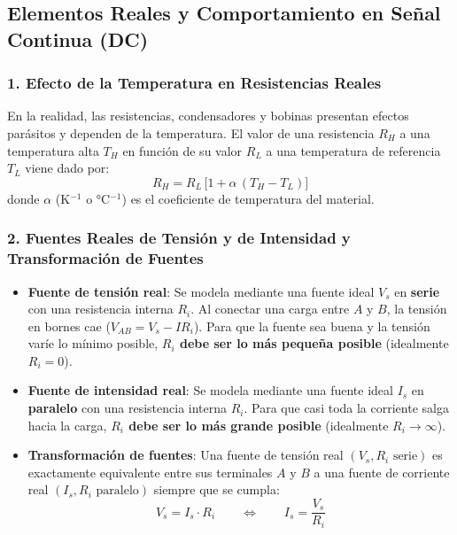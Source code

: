 \subsection{Elementos Reales y Comportamiento en Señal Continua (DC)}

\subsubsection{1. Efecto de la Temperatura en Resistencias Reales}
En la realidad, las resistencias, condensadores y bobinas presentan efectos parásitos y dependen de la temperatura. El valor de una resistencia $R_H$ a una temperatura alta $T_H$ en función de su valor $R_L$ a una temperatura de referencia $T_L$ viene dado por:
\begin{equation}
    R_H = R_L\,\big[1 + \alpha\,(T_H - T_L)\big]
\end{equation}
donde $\alpha$ ($\si{\kelvin^{-1}}$ o $\si{\celsius^{-1}}$) es el coeficiente de temperatura del material.

\subsubsection{2. Fuentes Reales de Tensión y de Intensidad y Transformación de Fuentes}
\begin{itemize}
    \item \textbf{Fuente de tensión real}: Se modela mediante una fuente ideal $V_s$ en \textbf{serie} con una resistencia interna $R_i$. Al conectar una carga entre $A$ y $B$, la tensión en bornes cae ($V_{AB} = V_s - I R_i$). Para que la fuente sea buena y la tensión varíe lo mínimo posible, \textbf{$R_i$ debe ser lo más pequeña posible} (idealmente $R_i = 0$).
    \item \textbf{Fuente de intensidad real}: Se modela mediante una fuente ideal $I_s$ en \textbf{paralelo} con una resistencia interna $R_i$. Para que casi toda la corriente salga hacia la carga, \textbf{$R_i$ debe ser lo más grande posible} (idealmente $R_i \to \infty$).
    \item \textbf{Transformación de fuentes}: Una fuente de tensión real $(V_s, R_i\text{ serie})$ es exactamente equivalente entre sus terminales $A$ y $B$ a una fuente de corriente real $(I_s, R_i\text{ paralelo})$ siempre que se cumpla:
    \begin{equation}
        V_s = I_s \cdot R_i \qquad \Longleftrightarrow \qquad I_s = \frac{V_s}{R_i}
    \end{equation}
\end{itemize}

